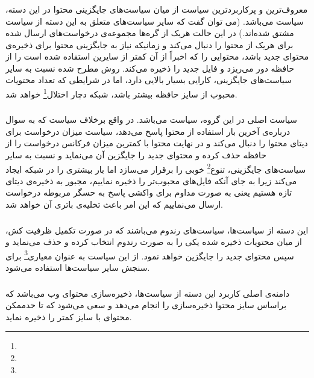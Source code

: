   \subsubsection{}
  معروف‌‌ترین و پرکاربردترین سیاست از میان سیاست‌های جایگزینی محتوا در این دسته، سیاست  می‌باشد. (می توان گفت که سایر سیاست‌های متعلق به این دسته از سیاست  مشتق شده‌اند.) در این حالت هریک از گره‌ها مجموعه‌ی درخواست‌های ارسال شده برای هریک از محتوا را دنبال می‌کند و زمانیکه نیاز به جایگزینی محتوا برای ذخیره‌ی محتوای جدید باشد، محتوایی را که اخبراً از آن کمتر از سایرین استفاده شده است را از حافظه دور می‌ریزد و فایل جدید را ذخیره می‌کند. روش مطرح شده نسبت به سایر سیاست‌های جایگزینی، کارایی بسیار بالایی دارد، اما در شرایطی که تعداد محتویات محبوب از سایز حافظه بیشتر باشد، شبکه دچار اختلال\footnote{} خواهد شد.
  
  \subsubsection{}
  سیاست اصلی در این گروه، سیاست  می‌باشد. در واقع برخلاف سیاست  که به سوال درباره‌ی آخرین بار استفاده از محتوا پاسخ می‌دهد،  سیاست  میزان درخواست برای دیتای محتوا را دنبال می‌کند و در نهایت محتوا با کمترین میزان فرکانس درخواست را از حافظه حذف کرده و محتوای جدید را جایگزین آن می‌نماید و نسبت به سایر سیاست‌های جایگزینی، تنوع\footnote{} خوبی را برقرار می‌سازد اما بار بیشتری را در شبکه ایجاد می‌کند زیرا به جای آنکه فایل‌های محبوب‌تر را ذخیره نماییم، مجبور به ذخیره‌ی دیتای تازه هستیم یعنی به صورت مداوم برای واکشی پاسخ به حسگر مربوطه درخواست ارسال می‌نماییم که این امر باعث تخلیه‌ی باتری آن خواهد شد.
  
  \subsubsection{}
  این دسته از سیاست‌ها، سیاست‌های رندوم می‌باشند که در صورت تکمیل ظرفیت کش، از میان محتویات ذخیره شده یکی را به صورت رندوم انتخاب کرده و حذف می‌نماید و سپس محتوای جدید را جایگزین خواهد نمود. از این سیاست به عنوان معیاری\footnote{} برای سنجش سایر سیاست‌ها استفاده می‌شود.
  
  \subsubsection{}
  دامنه‌ی اصلی کاربرد این دسته از سیاست‌ها، ذخیره‌سازی محتوای وب می‌باشد که براساس سایز محتوا ذخیره‌سازی را انجام می‌دهد و سعی می‌شود که تا حدممکن محتوای با سایز کمتر را ذخیره نماید.
 
